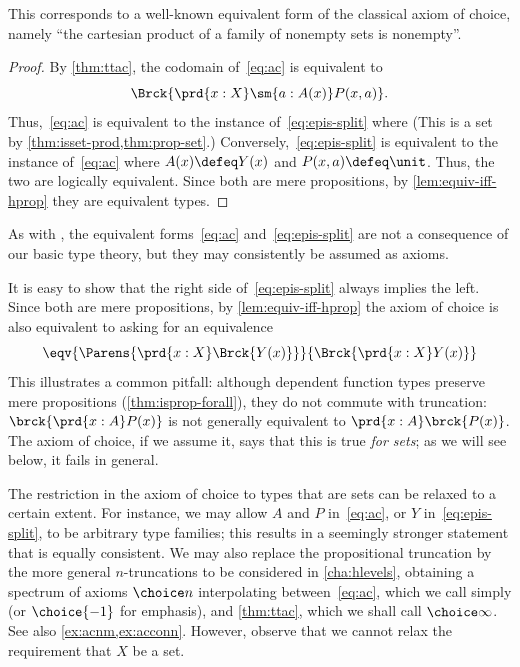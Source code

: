 This corresponds to a well-known equivalent form of the classical axiom of choice, namely ``the cartesian product of a family of nonempty sets is nonempty''.

\begin{proof}
  By \cref{thm:ttac}, the codomain of~\eqref{eq:ac} is equivalent to
  \[\Brck{\prd{x:X} \sm{a:A(x)} P(x,a)}.\]
  Thus,~\eqref{eq:ac} is equivalent to the instance of~\eqref{eq:epis-split} where 
  (This is a set by \cref{thm:isset-prod,thm:prop-set}.)
  Conversely,~\eqref{eq:epis-split} is equivalent to the instance of~\eqref{eq:ac} where $A(x)\defeq Y(x)$ and $P(x,a)\defeq\unit$.
  Thus, the two are logically equivalent.
  Since both are mere propositions, by \cref{lem:equiv-iff-hprop} they are equivalent types.
\end{proof}

As with \LEM{}, the equivalent forms~\eqref{eq:ac} and~\eqref{eq:epis-split} are not a consequence of our basic type theory, but they may consistently be assumed as axioms.

\begin{rmk}
  It is easy to show that the right side of~\eqref{eq:epis-split} always implies the left.
  Since both are mere propositions, by \cref{lem:equiv-iff-hprop} the axiom of choice is also equivalent to asking for an equivalence
  \[ \eqv{\Parens{\prd{x:X} \Brck{Y(x)}}}{\Brck{\prd{x:X} Y(x)}} \]
  This illustrates a common pitfall: although dependent function types preserve mere propositions (\cref{thm:isprop-forall}), they do not commute with truncation: $\brck{\prd{x:A} P(x)}$ is not generally equivalent to $\prd{x:A} \brck{P(x)}$.
  The axiom of choice, if we assume it, says that this is true \emph{for sets}; as we will see below, it fails in general.
\end{rmk}

The restriction in the axiom of choice to types that are sets can be relaxed to a certain extent.
For instance, we may allow $A$ and $P$ in~\eqref{eq:ac}, or $Y$ in~\eqref{eq:epis-split}, to be arbitrary type families; this results in a seemingly stronger statement that is equally consistent.
We may also replace the propositional truncation by the more general $n$-truncations to be considered in \cref{cha:hlevels}, obtaining a spectrum of axioms $\choice n$ interpolating between~\eqref{eq:ac}, which we call simply \choice{} (or $\choice{-1}$ for emphasis), and \cref{thm:ttac}, which we shall call $\choice\infty$.
See also \cref{ex:acnm,ex:acconn}.
However, observe that we cannot relax the requirement that $X$ be a set.

